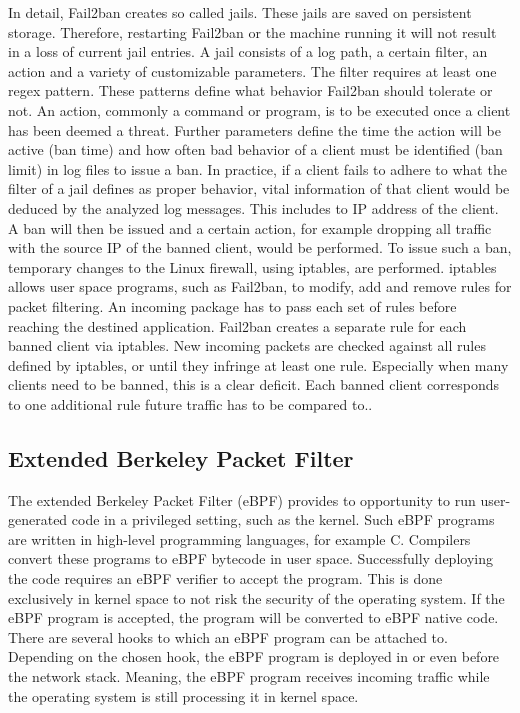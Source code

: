 In detail, Fail2ban creates so called jails.
These jails are saved on persistent storage.
Therefore, restarting Fail2ban or the machine running it will not result in a loss of current jail entries.
A jail consists of a log path, a certain filter, an action and a variety of customizable parameters.
The filter requires at least one regex pattern.
These patterns define what behavior Fail2ban should tolerate or not.
An action, commonly a command or program, is to be executed once a client has been deemed a threat.
Further parameters define the time the action will be active (ban time) and how often bad behavior of a client must be identified (ban limit) in log files to issue a ban.
In practice, if a client fails to adhere to what the filter of a jail defines as proper behavior, vital information of that client would be deduced by the analyzed log messages.
This includes to IP address of the client.
A ban will then be issued and a certain action, for example dropping all traffic with the source IP of the banned client, would be performed.
To issue such a ban, temporary changes to the Linux firewall, using iptables, are performed.
iptables allows user space programs, such as Fail2ban, to modify, add and remove rules for packet filtering.
An incoming package has to pass each set of rules before reaching the destined application.
Fail2ban creates a separate rule for each banned client via iptables.
New incoming packets are checked against all rules defined by iptables, or until they infringe at least one rule.
Especially when many clients need to be banned, this is a clear deficit.
Each banned client corresponds to one additional rule future traffic has to be compared to.\cite{mikolajczak:ebpf}.

\subsection{Extended Berkeley Packet Filter}
The extended Berkeley Packet Filter (eBPF) provides to opportunity to run user-generated code in a privileged setting, such as the kernel.
Such eBPF programs are written in high-level programming languages, for example C.
Compilers convert these programs to eBPF bytecode in user space.
Successfully deploying the code requires an eBPF verifier to accept the program.
This is done exclusively in kernel space to not risk the security of the operating system.
If the eBPF program is accepted, the program will be converted to eBPF native code.
There are several hooks to which an eBPF program can be attached to.
Depending on the chosen hook, the eBPF program is deployed in or even before the network stack.
Meaning, the eBPF program receives incoming traffic while the operating system is still processing it in kernel space.\cite{mikolajczak:ebpf}

